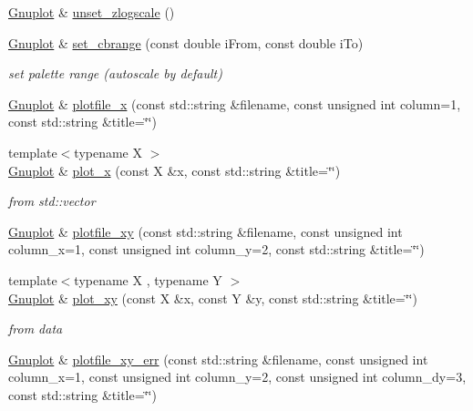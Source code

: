 \begin{DoxyCompactItemize}
\item 
\mbox{\hyperlink{class_gnuplot}{Gnuplot}} \& \mbox{\hyperlink{class_gnuplot_afa67f022ca344593b054d7f2e3406c7e}{unset\+\_\+zlogscale}} ()
\item 
\mbox{\label{class_gnuplot_a2228f5ab4cce2da463fc90383076a598}} 
\mbox{\hyperlink{class_gnuplot}{Gnuplot}} \& \mbox{\hyperlink{class_gnuplot_a2228f5ab4cce2da463fc90383076a598}{set\+\_\+cbrange}} (const double i\+From, const double i\+To)
\begin{DoxyCompactList}\small\item\em set palette range (autoscale by default) \end{DoxyCompactList}\item 
\mbox{\hyperlink{class_gnuplot}{Gnuplot}} \& \mbox{\hyperlink{class_gnuplot_a4fc34218cdfdd27a65b92eea1f1f9e84}{plotfile\+\_\+x}} (const std\+::string \&filename, const unsigned int column=1, const std\+::string \&title=\char`\"{}\char`\"{})
\item 
{\footnotesize template$<$typename X $>$ }\\\mbox{\hyperlink{class_gnuplot}{Gnuplot}} \& \mbox{\hyperlink{class_gnuplot_a80f3b2baae2bceff78ad005d9c3ec3fb}{plot\+\_\+x}} (const X \&x, const std\+::string \&title=\char`\"{}\char`\"{})
\begin{DoxyCompactList}\small\item\em from std\+::vector \end{DoxyCompactList}\item 
\mbox{\hyperlink{class_gnuplot}{Gnuplot}} \& \mbox{\hyperlink{class_gnuplot_a10e1fc7344bd726faa2d70cd5ced5e5e}{plotfile\+\_\+xy}} (const std\+::string \&filename, const unsigned int column\+\_\+x=1, const unsigned int column\+\_\+y=2, const std\+::string \&title=\char`\"{}\char`\"{})
\item 
{\footnotesize template$<$typename X , typename Y $>$ }\\\mbox{\hyperlink{class_gnuplot}{Gnuplot}} \& \mbox{\hyperlink{class_gnuplot_a0514a7391de6b42e79732ce746c310f7}{plot\+\_\+xy}} (const X \&x, const Y \&y, const std\+::string \&title=\char`\"{}\char`\"{})
\begin{DoxyCompactList}\small\item\em from data \end{DoxyCompactList}\item 
\mbox{\hyperlink{class_gnuplot}{Gnuplot}} \& \mbox{\hyperlink{class_gnuplot_afe9d44ba12f617188111ab915010f3ab}{plotfile\+\_\+xy\+\_\+err}} (const std\+::string \&filename, const unsigned int column\+\_\+x=1, const unsigned int column\+\_\+y=2, const unsigned int column\+\_\+dy=3, const std\+::string \&title=\char`\"{}\char`\"{})

\end{DoxyCompactItemize}
